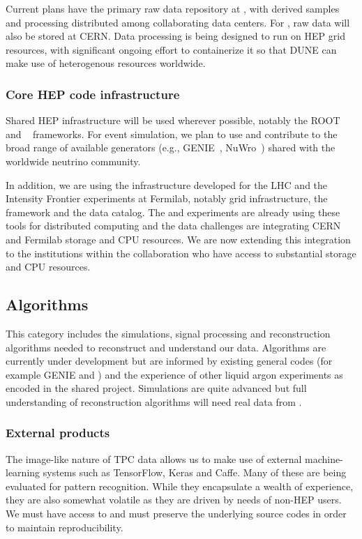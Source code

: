 Current plans have the primary raw data repository at \fnal, with derived samples and processing distributed among collaborating data centers.  For , raw data will also be stored at CERN.  Data processing is being designed to run on HEP grid resources, with significant ongoing effort to containerize it so that DUNE can make use of heterogenous resources worldwide. 


\subsubsection{Core HEP code infrastructure}
Shared HEP infrastructure will be used wherever possible, notably the ROOT\cite{root} and ~\cite{geant4,Allison:2006ve} frameworks.   For event simulation, we plan to use and contribute to  the broad range of available generators (e.g., GENIE~\cite{Andreopoulos:2009rq}, NuWro~\cite{NuWro2012}) shared with the worldwide neutrino community.

In addition, we are using the infrastructure developed for the LHC and the Intensity Frontier experiments at Fermilab, notably grid infrastructure,  the  framework and the  data catalog.  The  and  experiments are already using these tools for distributed computing and the  data challenges are integrating CERN and Fermilab storage and CPU resources.  We are now extending this integration to the  institutions within the collaboration who have access to substantial storage and CPU resources. 



\subsection{Algorithms}
This category includes the simulations, signal processing and reconstruction algorithms needed to reconstruct and understand our data. Algorithms are currently under development but are  informed by existing general codes (for example GENIE and ) and the experience of other liquid argon experiments as encoded in the shared   project.  Simulations are quite advanced but full understanding of reconstruction algorithms will need real data from . 

\subsubsection{External products}
The image-like nature of TPC data allows us to make use of external machine-learning systems such as TensorFlow\cite{DBLP:journals/corr/AbadiABBCCCDDDG16}, 
Keras\cite{chollet2015keras} and Caffe\cite{Jia:2014:CCA:2647868.2654889}.  Many of these are being evaluated for pattern recognition. While they encapsulate a wealth of experience, they are also somewhat volatile as they are driven by needs of non-HEP users.  We must have access to and must preserve the underlying source codes in order to maintain reproducibility. 



